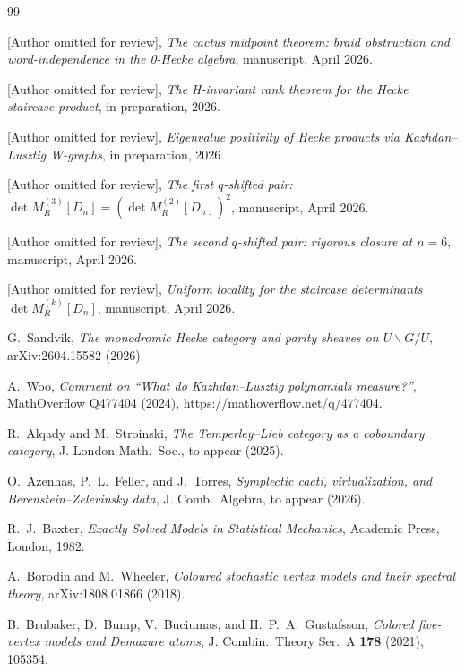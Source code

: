 \documentclass[11pt,a4paper]{article}
\theoremstyle{plain}
\theoremstyle{definition}
\theoremstyle{remark}
\begin{document}
\begin{thebibliography}{99}

[Author omitted for review],
\emph{The cactus midpoint theorem: braid obstruction and word-independence
in the 0-Hecke algebra},
manuscript, April 2026.

[Author omitted for review],
\emph{The H-invariant rank theorem for the Hecke staircase product},
in preparation, 2026.

[Author omitted for review],
\emph{Eigenvalue positivity of Hecke products via Kazhdan--Lusztig W-graphs},
in preparation, 2026.

[Author omitted for review],
\emph{The first $q$-shifted pair: $\det M_R^{(3)}[D_n] = (\det M_R^{(2)}[D_n])^2$},
manuscript, April 2026.

[Author omitted for review],
\emph{The second $q$-shifted pair: rigorous closure at $n = 6$},
manuscript, April 2026.

[Author omitted for review],
\emph{Uniform locality for the staircase determinants $\det M_R^{(k)}[D_n]$},
manuscript, April 2026.

G.~Sandvik,
\emph{The monodromic Hecke category and parity sheaves on $U \backslash G / U$},
arXiv:2604.15582 (2026).

A.~Woo,
\emph{Comment on ``What do Kazhdan--Lusztig polynomials measure?''},
MathOverflow Q477404 (2024),
\url{https://mathoverflow.net/q/477404}.

R.~Alqady and M.~Stroinski,
\emph{The Temperley--Lieb category as a coboundary category},
J. London Math.\ Soc., to appear (2025).

O.~Azenhas, P.~L.~Feller, and J.~Torres,
\emph{Symplectic cacti, virtualization, and Berenstein--Zelevinsky data},
J. Comb.\ Algebra, to appear (2026).

R.~J.~Baxter,
\emph{Exactly Solved Models in Statistical Mechanics},
Academic Press, London, 1982.

A.~Borodin and M.~Wheeler,
\emph{Coloured stochastic vertex models and their spectral theory},
arXiv:1808.01866 (2018).

B.~Brubaker, D.~Bump, V.~Buciumas, and H.~P.~A.~Gustafsson,
\emph{Colored five-vertex models and Demazure atoms},
J. Combin.\ Theory Ser.~A \textbf{178} (2021), 105354.


\end{thebibliography}
\end{document}
